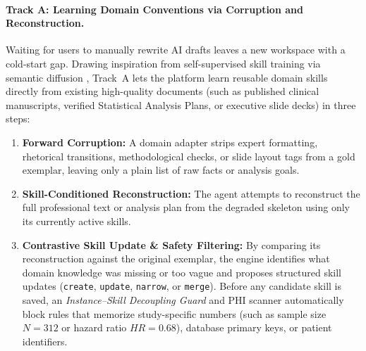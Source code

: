 \documentclass[11pt,a4paper]{article}
\begin{document}
\paragraph{Track A: Learning Domain Conventions via Corruption and Reconstruction.}
Waiting for users to manually rewrite AI drafts leaves a new workspace with a cold-start gap. Drawing inspiration from self-supervised skill training via semantic diffusion \cite{li2026skilltraining}, Track~A lets the platform learn reusable domain skills directly from existing high-quality documents (such as published clinical manuscripts, verified Statistical Analysis Plans, or executive slide decks) in three steps:
\begin{enumerate}[leftmargin=1.5em,itemsep=1pt]
  \item \textbf{Forward Corruption:} A domain adapter strips expert formatting, rhetorical transitions, methodological checks, or slide layout tags from a gold exemplar, leaving only a plain list of raw facts or analysis goals.
  \item \textbf{Skill-Conditioned Reconstruction:} The agent attempts to reconstruct the full professional text or analysis plan from the degraded skeleton using only its currently active skills.
  \item \textbf{Contrastive Skill Update \& Safety Filtering:} By comparing its reconstruction against the original exemplar, the engine identifies what domain knowledge was missing or too vague and proposes structured skill updates (\texttt{create}, \texttt{update}, \texttt{narrow}, or \texttt{merge}). Before any candidate skill is saved, an \emph{Instance--Skill Decoupling Guard} and PHI scanner automatically block rules that memorize study-specific numbers (such as sample size $N=312$ or hazard ratio $HR=0.68$), database primary keys, or patient identifiers.
\end{enumerate}
\end{document}
